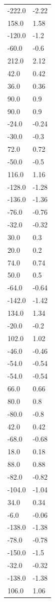 \begin{longtable}{ll}
-222.0 & -2.22 \\
158.0 & 1.58 \\
-120.0 & -1.2 \\
-60.0 & -0.6 \\
212.0 & 2.12 \\
42.0 & 0.42 \\
36.0 & 0.36 \\
90.0 & 0.9 \\
90.0 & 0.9 \\
-24.0 & -0.24 \\
-30.0 & -0.3 \\
72.0 & 0.72 \\
-50.0 & -0.5 \\
116.0 & 1.16 \\
-128.0 & -1.28 \\
-136.0 & -1.36 \\
-76.0 & -0.76 \\
-32.0 & -0.32 \\
30.0 & 0.3 \\
20.0 & 0.2 \\
74.0 & 0.74 \\
50.0 & 0.5 \\
-64.0 & -0.64 \\
-142.0 & -1.42 \\
134.0 & 1.34 \\
-20.0 & -0.2 \\
102.0 & 1.02 \\
-46.0 & -0.46 \\
-54.0 & -0.54 \\
-54.0 & -0.54 \\
66.0 & 0.66 \\
80.0 & 0.8 \\
-80.0 & -0.8 \\
42.0 & 0.42 \\
-68.0 & -0.68 \\
18.0 & 0.18 \\
88.0 & 0.88 \\
-82.0 & -0.82 \\
-104.0 & -1.04 \\
34.0 & 0.34 \\
-6.0 & -0.06 \\
-138.0 & -1.38 \\
-78.0 & -0.78 \\
-150.0 & -1.5 \\
-32.0 & -0.32 \\
-138.0 & -1.38 \\
106.0 & 1.06 \\

\end{longtable}
